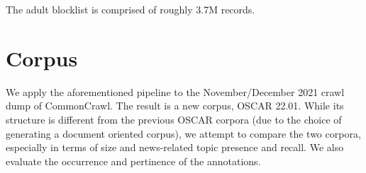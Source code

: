 The adult blocklist is comprised of roughly 3.7M records.








\section{Corpus}

We apply the aforementioned pipeline to the November/December 2021 crawl dump of CommonCrawl. The result is a new corpus, OSCAR 22.01. While its structure is different from the previous OSCAR corpora (due to the choice of generating a document oriented corpus), we attempt to compare the two corpora, especially in terms of size and news-related topic presence and recall. We also evaluate the occurrence and pertinence of the annotations.

